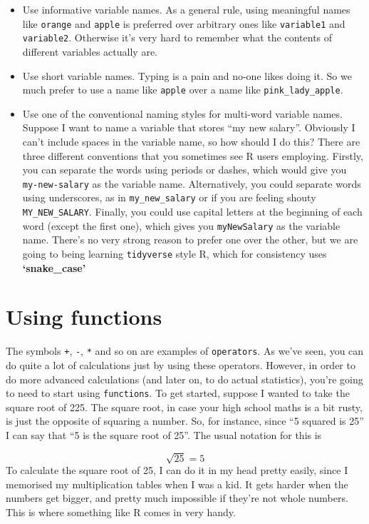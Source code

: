 \documentclass[
]{book}
\begin{document}
\begin{itemize}
\item
  Use informative variable names. As a general rule, using meaningful names like \texttt{orange} and \texttt{apple} is preferred over arbitrary ones like \texttt{variable1} and \texttt{variable2}. Otherwise it's very hard to remember what the contents of different variables actually are.
\item
  Use short variable names. Typing is a pain and no-one likes doing it. So we much prefer to use a name like \texttt{apple} over a name like \texttt{pink\_lady\_apple}.
\item
  Use one of the conventional naming styles for multi-word variable names. Suppose I want to name a variable that stores ``my new salary''. Obviously I can't include spaces in the variable name, so how should I do this? There are three different conventions that you sometimes see R users employing. Firstly, you can separate the words using periods or dashes, which would give you \texttt{my-new-salary} as the variable name. Alternatively, you could separate words using underscores, as in \texttt{my\_new\_salary} or if you are feeling shouty \texttt{MY\_NEW\_SALARY}. Finally, you could use capital letters at the beginning of each word (except the first one), which gives you \texttt{myNewSalary} as the variable name. There's no very strong reason to prefer one over the other, but we are going to being learning \texttt{tidyverse} style R, which for consistency uses \textbf{`snake\_case'}
\end{itemize}

\hypertarget{using-functions}{%
\section{Using functions}\label{using-functions}}

The symbols \texttt{+}, \texttt{-}, \texttt{*} and so on are examples of \texttt{operators}. As we've seen, you can do quite a lot of calculations just by using these operators. However, in order to do more advanced calculations (and later on, to do actual statistics), you're going to need to start using \texttt{functions}.
To get started, suppose I wanted to take the square root of 225. The square root, in case your high school maths is a bit rusty, is just the opposite of squaring a number. So, for instance, since ``5 squared is 25'' I can say that ``5 is the square root of 25''. The usual notation for this is

\[
\sqrt{25} = 5
\]
To calculate the square root of 25, I can do it in my head pretty easily, since I memorised my multiplication tables when I was a kid. It gets harder when the numbers get bigger, and pretty much impossible if they're not whole numbers. This is where something like R comes in very handy.
\end{document}
